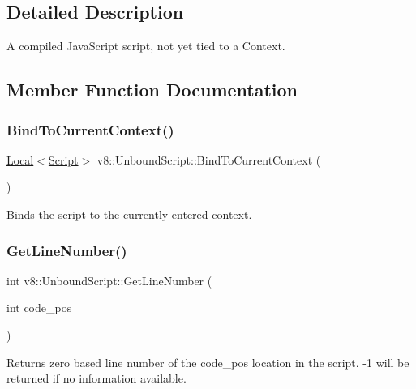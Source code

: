 \subsection{Detailed Description}
A compiled Java\+Script script, not yet tied to a Context. 

\subsection{Member Function Documentation}
\mbox{\label{classv8_1_1UnboundScript_a0f3354dc71e3f831d10f6e82704a4c2b}} 
\subsubsection{\texorpdfstring{Bind\+To\+Current\+Context()}{BindToCurrentContext()}}
{\footnotesize\ttfamily \mbox{\hyperlink{classv8_1_1Local}{Local}}$<$\mbox{\hyperlink{classv8_1_1Script}{Script}}$>$ v8\+::\+Unbound\+Script\+::\+Bind\+To\+Current\+Context (\begin{DoxyParamCaption}{ }\end{DoxyParamCaption})}

Binds the script to the currently entered context. \mbox{\label{classv8_1_1UnboundScript_a020ca8bbe6ea2313aeedc993ccac3741}} 
\subsubsection{\texorpdfstring{Get\+Line\+Number()}{GetLineNumber()}}
{\footnotesize\ttfamily int v8\+::\+Unbound\+Script\+::\+Get\+Line\+Number (\begin{DoxyParamCaption}\item[{int}]{code\+\_\+pos }\end{DoxyParamCaption})}

Returns zero based line number of the code\+\_\+pos location in the script. -\/1 will be returned if no information available. \mbox{\label{classv8_1_1UnboundScript_ae237f900eb0821e4121f45de4151c7e8}} 
